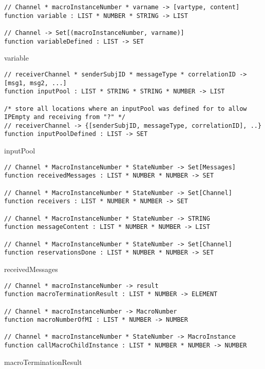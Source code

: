 \begin{listing}[H]
\begin{verbatim}
// Channel * macroInstanceNumber * varname -> [vartype, content]
function variable : LIST * NUMBER * STRING -> LIST

// Channel -> Set[(macroInstanceNumber, varname)]
function variableDefined : LIST -> SET
\end{verbatim}
\caption{variable}
\label{lst:asm:variable}
\end{listing}


\begin{listing}[H]
\begin{verbatim}
// receiverChannel * senderSubjID * messageType * correlationID -> [msg1, msg2, ...]
function inputPool : LIST * STRING * STRING * NUMBER -> LIST

/* store all locations where an inputPool was defined for to allow IPEmpty and receiving from "?" */
// receiverChannel -> {[senderSubjID, messageType, correlationID], ..}
function inputPoolDefined : LIST -> SET
\end{verbatim}
\caption{inputPool}
\label{lst:asm:inputPool}
\end{listing}



\begin{listing}[H]
\begin{verbatim}
// Channel * MacroInstanceNumber * StateNumber -> Set[Messages]
function receivedMessages : LIST * NUMBER * NUMBER -> SET

// Channel * MacroInstanceNumber * StateNumber -> Set[Channel]
function receivers : LIST * NUMBER * NUMBER -> SET

// Channel * MacroInstanceNumber * StateNumber -> STRING
function messageContent : LIST * NUMBER * NUMBER -> LIST

// Channel * MacroInstanceNumber * StateNumber -> Set[Channel]
function reservationsDone : LIST * NUMBER * NUMBER -> SET
\end{verbatim}
\caption{receivedMessages}
\label{lst:asm:receivedMessages}
\end{listing}




\begin{listing}[H]
\begin{verbatim}
// Channel * macroInstanceNumber -> result
function macroTerminationResult : LIST * NUMBER -> ELEMENT

// Channel * macroInstanceNumber -> MacroNumber
function macroNumberOfMI : LIST * NUMBER -> NUMBER

// Channel * macroInstanceNumber * StateNumber -> MacroInstance
function callMacroChildInstance : LIST * NUMBER * NUMBER -> NUMBER
\end{verbatim}
\caption{macroTerminationResult}
\label{lst:asm:macroTerminationResult}
\end{listing}




